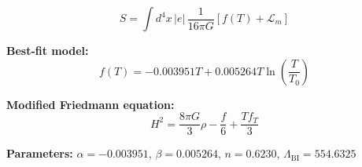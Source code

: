 
\begin{equation}
  S = \int d^4x \, |e| \, \frac{1}{16\pi G} \left[ f(T) + \mathcal{L}_m \right]
\end{equation}

\textbf{Best-fit model:}
\begin{equation}
  f(T) = -0.003951 T + 0.005264 T \ln\!\left(\frac{T}{T_0}\right)
\end{equation}

\textbf{Modified Friedmann equation:}
\begin{equation}
  H^2 = \frac{8\pi G}{3} \rho - \frac{f}{6} + \frac{T f_T}{3}
\end{equation}

\textbf{Parameters:}
$\alpha = -0.003951$, \quad
$\beta = 0.005264$, \quad
$n = 0.6230$, \quad
$\Lambda_{\text{BI}} = 554.6325$